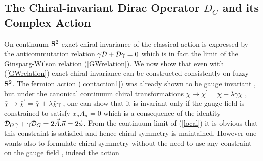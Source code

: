 \documentclass[a4paper,10pt]{article}
\begin{document}
\subsection{The Chiral-invariant Dirac Operator $D_C$ and its Complex Action}
On continuum ${\bf S}^2$ exact chiral invariance of the classical
action is expressed by the anticommutation relation
${\gamma}{\cal D}+{\cal D}{\gamma}=0$ which is in fact the limit
of the Ginsparg-Wilson relation (\ref{GWrelation}). We now show
that even with (\ref{GWrelation}) exact chiral invariance can be
constructed consistently on fuzzy ${\bf S}^2$. The fermion action
(\ref{contaction1}) was already shown to be gauge invariant , but
under the canonical continuum chiral transformations
${\chi}{\longrightarrow}{\chi}^{'}={\chi}+{\lambda}{\gamma}{\chi}$
, $
\bar{\chi}{\longrightarrow}\bar{\chi}^{'}=\bar{\chi}+{\lambda}\bar{\chi}{\gamma}$
, one can show that it is invariant only if the gauge field is
constrained to satisfy $x_aA_a=0$ which is a consequence of the
identity ${\cal D}_G{\gamma}+{\gamma}{\cal D}_G=2\vec{A}.\vec{n}
=2{\phi}$. From the continuum limit of (\ref{local}) it is
obvious that this constraint is satisfied and hence chiral
symmetry is maintained. However one wants also to formulate
chiral symmetry without the need to use any constraint on the
gauge field , indeed the action
\end{document}
